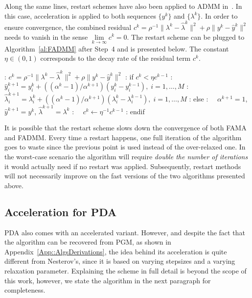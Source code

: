 \documentclass[openany]{now}
\begin{document}
Along the same lines, restart schemes have also been applied to ADMM in~\cite{goldstein2014fast}. In this case, acceleration is applied to both sequences $\{y^k\}$ and $\{\lambda^k\}$. In order to ensure convergence, the combined residual $c^k = \rho^{-1}\|\lambda^k-\hat{\lambda}^k\|^2 + \rho\|y^k-\hat{y}^k\|^2$ needs to vanish in the sense $\underset{k\to\infty}{\lim}c^k=0$. The restart scheme can be plugged to Algorithm~\ref{al:FADMM} after Step~4 and is presented below. The constant $\eta\in (0,1)$ corresponds to the decay rate of the residual term $c^k$.

\begin{algorithm}
\begin{algorithmic}
: $c^k = \rho^{-1}\|\lambda^k-\hat{\lambda}^k\|^2 + \rho\|y^k-\hat{y}^k\|^2$
: if $c^k < \eta c^{k-1}$
: $\hat{y}_i^{k+1} = y_i^k + ((\alpha^k-1)/\alpha^{k+1})(y_i^k-y_i^{k-1}),\; i=1,\ldots,M$
: $\hat{\lambda}_i^{k+1} = \lambda_i^k + ((\alpha^k-1)/\alpha^{k+1})(\lambda_i^k-\lambda_i^{k-1}),\; i=1,\ldots,M$
: else
: $\quad\alpha^{k+1}=1$, $\hat{y}^{k+1} = y^{k}$, $\hat{\lambda}^{k+1} = \lambda^{k}$
: $\quad c^k \leftarrow \eta^{-1}c^{k-1}$
: endif
\end{algorithmic}
\end{algorithm}\begin{footnotesize}
\end{footnotesize}
\begin{remark}
 It is possible that the restart scheme slows down the convergence of both FAMA and FADMM. Every time a restart happens, one full iteration of the algorithm goes to waste since the previous point is used instead of the over-relaxed one. In the worst-case scenario the algorithm will require \emph{double the number of iterations} it would actually need if no restart was applied. Subsequently, restart methods will not necessarily improve on the fast versions of the two algorithms presented above.
\end{remark}

\subsection{Acceleration for PDA}
PDA also comes with an accelerated variant. However, and despite the fact that the algorithm can be recovered from PGM, as shown in Appendix~\ref{App::AlgsDerivations}, the idea behind its acceleration is quite different from Nesterov's, since it is based on varying stepsizes and a varying relaxation parameter. Explaining the scheme in full detail is beyond the scope of this work, however, we state the algorithm in the next paragraph for completeness.
\end{document}
